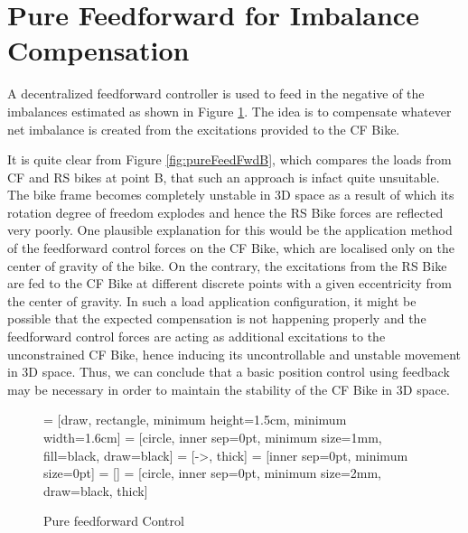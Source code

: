 \section{Pure Feedforward for Imbalance Compensation}
\label{sec:chap3sec2}
A decentralized feedforward controller is used to feed in the negative of the imbalances estimated as shown in Figure \ref{fig:feedfwd}. The idea is to compensate whatever net imbalance is created from the excitations provided to the CF Bike.

It is quite clear from Figure \ref{fig:pureFeedFwdB}, which compares the loads from CF and RS bikes at point B, that such an approach is infact quite unsuitable. The bike frame becomes completely unstable in 3D space as a result of which its rotation degree of freedom explodes and hence the RS Bike forces are reflected very poorly. One plausible explanation for this would be the application method of the feedforward control forces on the CF Bike, which are localised only on the center of gravity of the bike. On the contrary, the excitations from the RS Bike are fed to the CF Bike at different discrete points with a given eccentricity from the center of gravity. In such a load application configuration, it might be possible that the expected compensation is not happening properly and the feedforward control forces are acting as additional excitations to the unconstrained CF Bike, hence inducing its uncontrollable and unstable movement in 3D space.
Thus, we can conclude that a basic position control using feedback may be necessary in order to maintain the stability of the CF Bike in 3D space.
\begin{figure}[h!]
  \centering
       = [draw, rectangle, minimum height=1.5cm, minimum width=1.6cm]
        = [circle, inner sep=0pt, minimum size=1mm, fill=black, draw=black]
     = [->, thick]
         = [inner sep=0pt, minimum size=0pt]
         = []
           = [circle, inner sep=0pt, minimum size=2mm, draw=black, thick]
	  \caption{Pure feedforward Control}
    \label{fig:feedfwd}
\end{figure}


